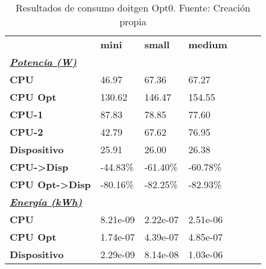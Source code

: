 \begin{table}[H]
    \centering
    \begin{tabular}{lllllll}
    \rowcolor[HTML]{DAE8FC} \ & \textbf{mini} & \textbf{	small} & \textbf{	medium} \\
    \cellcolor[HTML]{DAE8FC} \textbf{\textbf{{\emph{{\underline{{Potencia (W)}}}}}}} &  & 	 & 	 \\
    \rowcolor[HTML]{EFEFEF} \cellcolor[HTML]{DAE8FC} \textbf{CPU} & 46.97 & 	67.36 & 	67.27 \\
    \cellcolor[HTML]{DAE8FC} \textbf{CPU Opt} & 130.62 & 	146.47 & 	154.55 \\
    \rowcolor[HTML]{EFEFEF} \cellcolor[HTML]{DAE8FC} \textbf{\quad CPU-1} & 87.83 & 	78.85 & 	77.60 \\
    \cellcolor[HTML]{DAE8FC} \textbf{\quad CPU-2} & 42.79 & 	67.62 & 	76.95 \\
    \rowcolor[HTML]{EFEFEF} \cellcolor[HTML]{DAE8FC} \textbf{Dispositivo} & 25.91 & 	26.00 & 	26.38 \\
    \cellcolor[HTML]{DAE8FC} \textbf{CPU->Disp} & -44.83\% & 	-61.40\% & 	-60.78\% \\
    \rowcolor[HTML]{EFEFEF} \cellcolor[HTML]{DAE8FC} \textbf{CPU Opt->Disp} & -80.16\% & 	-82.25\% & 	-82.93\% \\
    \cellcolor[HTML]{DAE8FC} \textbf{\textbf{{\emph{{\underline{{Energía (kWh)}}}}}}} &  & 	 & 	 \\
    \rowcolor[HTML]{EFEFEF} \cellcolor[HTML]{DAE8FC} \textbf{CPU} & 8.21e-09 & 	2.22e-07 & 	2.51e-06 \\
    \cellcolor[HTML]{DAE8FC} \textbf{CPU Opt} & 1.74e-07 & 	4.39e-07 & 	4.85e-07 \\
    \rowcolor[HTML]{EFEFEF} \cellcolor[HTML]{DAE8FC} \textbf{Dispositivo} & 2.29e-09 & 	8.14e-08 & 	1.03e-06 \\
    \end{tabular}
    \caption[Resultados de consumo doitgen Opt0]{{Resultados de consumo doitgen Opt0. Fuente: Creación propia}}
    \label{table_test_doitgen_Opt0_hw_powerResults}
\end{table}